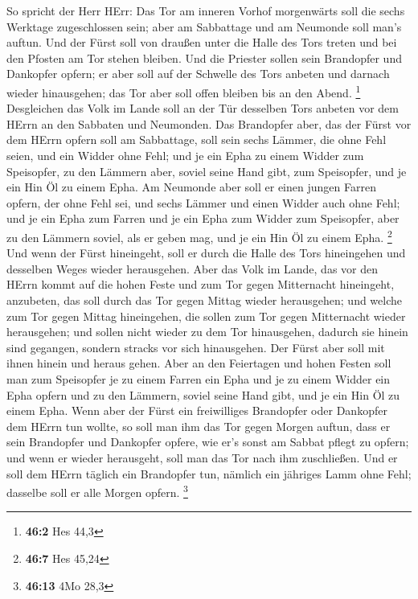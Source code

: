  So spricht der Herr HErr: Das Tor am inneren Vorhof
morgenwärts soll die sechs Werktage zugeschlossen sein; aber am
Sabbattage und am Neumonde soll man's auftun.  Und der Fürst
soll von draußen unter die Halle des Tors treten und bei den Pfosten am
Tor stehen bleiben. Und die Priester sollen sein Brandopfer und
Dankopfer opfern; er aber soll auf der Schwelle des Tors anbeten und
darnach wieder hinausgehen; das Tor aber soll offen bleiben bis an den
Abend. \footnote{\textbf{46:2} Hes 44,3}  Desgleichen das
Volk im Lande soll an der Tür desselben Tors anbeten vor dem HErrn an
den Sabbaten und Neumonden.  Das Brandopfer aber, das der
Fürst vor dem HErrn opfern soll am Sabbattage, soll sein sechs Lämmer,
die ohne Fehl seien, und ein Widder ohne Fehl;  und je ein
Epha zu einem Widder zum Speisopfer, zu den Lämmern aber, soviel seine
Hand gibt, zum Speisopfer, und je ein Hin Öl zu einem Epha. 
Am Neumonde aber soll er einen jungen Farren opfern, der ohne Fehl sei,
und sechs Lämmer und einen Widder auch ohne Fehl;  und je
ein Epha zum Farren und je ein Epha zum Widder zum Speisopfer, aber zu
den Lämmern soviel, als er geben mag, und je ein Hin Öl zu einem Epha.
\footnote{\textbf{46:7} Hes 45,24}  Und wenn der Fürst
hineingeht, soll er durch die Halle des Tors hineingehen und desselben
Weges wieder herausgehen.  Aber das Volk im Lande, das vor
den HErrn kommt auf die hohen Feste und zum Tor gegen Mitternacht
hineingeht, anzubeten, das soll durch das Tor gegen Mittag wieder
herausgehen; und welche zum Tor gegen Mittag hineingehen, die sollen zum
Tor gegen Mitternacht wieder herausgehen; und sollen nicht wieder zu dem
Tor hinausgehen, dadurch sie hinein sind gegangen, sondern stracks vor
sich hinausgehen.  Der Fürst aber soll mit ihnen hinein und
heraus gehen.  Aber an den Feiertagen und hohen Festen soll
man zum Speisopfer je zu einem Farren ein Epha und je zu einem Widder
ein Epha opfern und zu den Lämmern, soviel seine Hand gibt, und je ein
Hin Öl zu einem Epha.  Wenn aber der Fürst ein freiwilliges
Brandopfer oder Dankopfer dem HErrn tun wollte, so soll man ihm das Tor
gegen Morgen auftun, dass er sein Brandopfer und Dankopfer opfere, wie
er's sonst am Sabbat pflegt zu opfern; und wenn er wieder herausgeht,
soll man das Tor nach ihm zuschließen.  Und er soll dem
HErrn täglich ein Brandopfer tun, nämlich ein jähriges Lamm ohne Fehl;
dasselbe soll er alle Morgen opfern. \footnote{\textbf{46:13} 4Mo 28,3}
